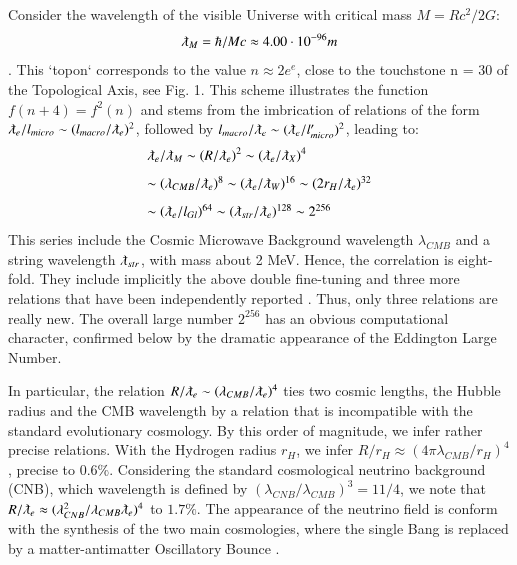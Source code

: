 \documentclass[twoside,draft]{article}
\begin{document}
\begin{sloppypar}
Consider the wavelength of the visible Universe with critical mass $M= Rc^2/2G$: $$\lambdabar_{M} = \hbar /Mc \approx 4.00 \cdot 10^{-96} m$$. This `topon` corresponds to the value $n \approx 2e^e$, close to the touchstone n = 30 of the Topological Axis, see Fig. 1. This scheme illustrates the function $f(n + 4) = f^{2}(n)$
and stems from the imbrication of relations of the form $\lambdabar_{e} /l_{micro} \sim (l_{macro} /\lambdabar_{e})^{2}$, followed by $ l_{macro} /\lambdabar_{e} \sim (\lambdabar_{e} /l^{\prime}_{micro} )^{2}$, leading to:
$$
\begin{array}{ll}
%
\displaystyle
\lambdabar_{e}/\lambdabar_{M} \sim (R/\lambdabar_{e})^{2} \sim (\lambdabar_{e}/ \lambdabar_{X})^{4}\\[+8pt]  %
\sim (\lambda_{CMB}/ \lambdabar_{e})^{8} \sim (\lambdabar_{e}/\lambdabar_{W})^{16} \sim (2r_{H} /\lambdabar_{e})^{32}\\[+8pt] %
\sim (\lambdabar_{e}/ l_{Gl} )^{64} \sim (\lambdabar_{str} /\lambdabar_{e} )^{128} \sim 2^{256}\\ %
\end{array}
$$
This series include the Cosmic Microwave Background wavelength $\lambda_{CMB}$ and a string wavelength $\lambdabar_{str}$, with mass about 2 MeV. Hence, the correlation is eight-fold. They include implicitly the above double fine-tuning and three  more relations that have been independently reported \cite{Sanchez1}. Thus, only three relations are really new. The overall large number $2^{256}$ has an obvious computational character, confirmed below by the dramatic appearance of the Eddington Large Number.

In particular, the relation $R/\lambdabar_{e} \sim (\lambda_{CMB} / \lambdabar_{e})^{4}$ ties two cosmic lengths, the Hubble radius and the CMB wavelength by a relation that is incompatible with the standard evolutionary cosmology. By this order of magnitude, we infer rather precise relations. With the Hydrogen radius $r_H$, we infer 
$ R/r_H \approx (4\pi \lambda_{CMB}/r_H)^{4}$, precise to $0.6\%$. 
Considering the standard cosmological neutrino background (CNB), which wavelength is defined by $(\lambda_{CNB} / \lambda_{CMB})^{3} = 11/4$, we note that $R/ \lambdabar_{e} \approx
( \lambda_{CNB}^{2} / \lambda_{CMB} \lambdabar_{e} )^{4}$ to $1.7\%$. The appearance of the neutrino field is conform with the synthesis of the two main cosmologies, where the single Bang is replaced by a matter-antimatter Oscillatory Bounce \cite{Sanchez2}.


\end{sloppypar}
\end{document}
